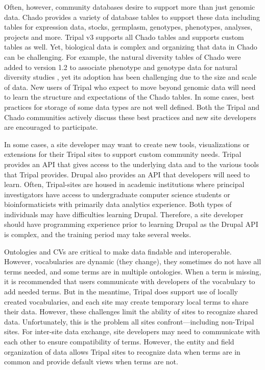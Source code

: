 Often, however, community databases desire to support more than just genomic data. Chado provides a variety of database tables to support these data including tables for expression data, stocks, germplasm, genotypes, phenotypes, analyses, projects and more. Tripal v3 supports all Chado tables and supports custom tables as well. Yet, biological data is complex and organizing that data in Chado can be challenging. For example, the natural diversity tables of Chado were added to version 1.2 to associate phenotype and genotype data for natural diversity studies \cite{Jung_2011}, yet its adoption has been challenging due to the size and scale of data. New users of Tripal who expect to move beyond genomic data will need to learn the structure and expectations of the Chado tables. In some cases, best practices for storage of some data types are not well defined. Both the Tripal and Chado communities actively discuss these best practices and new site developers are encouraged to participate.

In some cases, a site developer may want to create new tools, visualizations or extensions for their Tripal sites to support custom community needs. Tripal provides an API that gives access to the underlying data and to the various tools that Tripal provides. Drupal also provides an API that developers will need to learn. Often, Tripal-sites are housed in academic institutions where principal investigators have access to undergraduate computer science students or bioinformaticists with primarily data analytics experience. Both types of individuals may have difficulties learning Drupal. Therefore, a site developer should have programming experience prior to learning Drupal as the Drupal API is complex, and the training period may take several weeks.

Ontologies and CVs are critical to make data findable and interoperable. However, vocabularies are dynamic (they change), they sometimes do not have all terms needed, and some terms are in multiple ontologies. When a term is missing, it is recommended that users communicate with developers of the vocabulary to add needed terms. But in the meantime, Tripal does support use of locally created vocabularies, and each site may create temporary local terms to share their data. However, these challenges limit the ability of sites to recognize shared data. Unfortunately, this is the problem all sites confront—including non-Tripal sites. For inter-site data exchange, site developers may need to communicate with each other to ensure compatibility of terms. However, the entity and field organization of data allows Tripal sites to recognize data when terms are in common and provide default views when terms are not.

